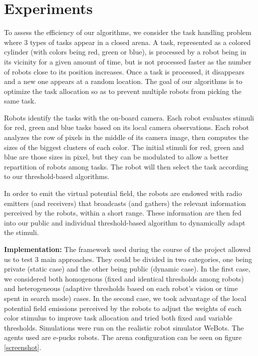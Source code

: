 \section{Experiments}
To assess the efficiency of our algorithms, we consider the task handling problem where 3 types of tasks appear in a closed arena. A task, represented as a colored cylinder (with colors being red, green or blue), is processed by a robot being in its vicinity for a given amount of time, but is not processed faster as the number of robots close to its position increases. Once a task is processed, it disappears and a new one appears at a random location. The goal of our algorithms is to optimize the task allocation so as to prevent multiple robots from picking the same task.

Robots identify the tasks with the on-board camera. Each robot evaluates stimuli for red, green and blue tasks based on its local camera observations. Each robot analyzes the row of pixels in the middle of its camera image, then computes the sizes of the biggest clusters of each color. The initial stimuli for red, green and blue are those sizes in pixel, but they can be modulated to allow a better repartition of robots among tasks. The  robot  will  then select the  task according to our threshold-based algorithms.

In order to emit the virtual potential field, the robots are endowed with radio emitters (and receivers) that broadcasts (and gathers) the relevant information perceived by the robots, within a short range. These information are then fed into our public and individual threshold-based algorithm to dynamically adapt the stimuli.

\textbf{Implementation:}
The framework used during the course of the project allowed us to test 3 main approaches. They could be divided in two categories, one being private (static case) and the other being public (dynamic case). In the first case, we considered both homogenous (fixed and identical thresholds among robots) and heterogeneous (adaptive thresholds based on each robot's vision or time spent in search mode) cases. In the second case, we took advantage of the local potential field emissions perceived by the robots to adjust the weights of each color stimulus to improve task allocation and tried both fixed and variable thresholds.
Simulations were run on the realistic robot simulator WeBots. The agents used are e-pucks robots. The arena configuration can be seen on figure \ref{screenshot}.

